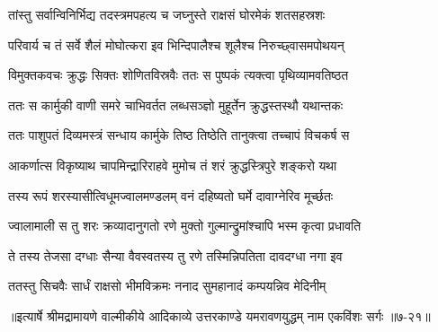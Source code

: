 \twolineshloka
{तांस्तु सर्वान्विनिर्भिद्य तदस्त्रमपहत्य च}
{जघ्नुस्ते राक्षसं घोरमेकं शतसहस्रशः} %

\twolineshloka
{परिवार्य च तं सर्वे शैलं मोघोत्करा इव}
{भिन्दिपालैश्च शूलैश्च निरुच्छ्वासमपोथयन्} %

\twolineshloka
{विमुक्तकवचः क्रुद्धः सिक्तः शोणितविस्रवैः}
{ततः स पुष्पकं त्यक्त्वा पृथिव्यामवतिष्ठत} %

\twolineshloka
{ततः स कार्मुकी वाणी समरे चाभिवर्तत}
{लब्धसञ्ज्ञो मुहूर्तेन क्रुद्धस्तस्थौ यथान्तकः} %

\twolineshloka
{ततः पाशुपतं दिव्यमस्त्रं सन्धाय कार्मुके}
{तिष्ठ तिष्ठेति तानुक्त्वा तच्चापं विचकर्ष स} %

\twolineshloka
{आकर्णात्स विकृष्याथ चापमिन्द्रारिराहवे}
{मुमोच तं शरं क्रुद्धस्त्रिपुरे शङ्करो यथा} %

\twolineshloka
{तस्य रूपं शरस्यासीत्विधूमज्वालमण्डलम्}
{वनं दहिष्यतो घर्मे दावाग्नेरिव मूर्च्छतः} %

\twolineshloka
{ज्वालामाली स तु शरः क्रव्यादानुगतो रणे}
{मुक्तो गुल्मान्द्रुमांश्चापि भस्म कृत्वा प्रधावति} %

\twolineshloka
{ते तस्य तेजसा दग्धाः सैन्या वैवस्वतस्य तु}
{रणे तस्मिन्निपतिता दावदग्धा नगा इव} %

\twolineshloka
{ततस्तु सिचवैः सार्धं राक्षसो भीमविक्रमः}
{ननाद सुमहानादं कम्पयन्निव मेदिनीम्} %


॥इत्यार्षे श्रीमद्रामायणे वाल्मीकीये आदिकाव्ये उत्तरकाण्डे यमरावणयुद्धम् नाम एकविंशः सर्गः ॥७-२१॥
